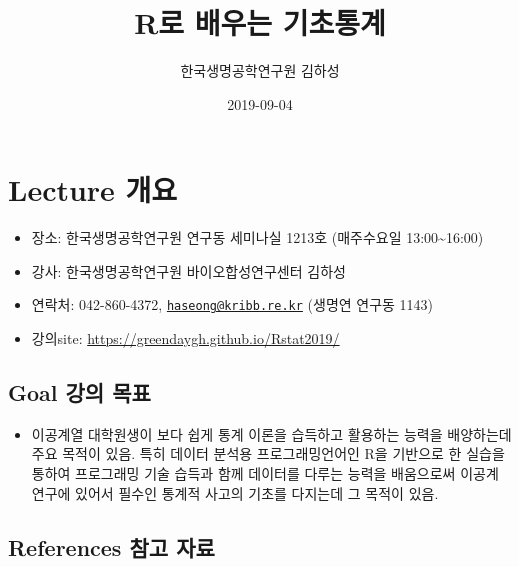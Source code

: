 \documentclass[]{book}
\title{R로 배우는 기초통계}
\author{한국생명공학연구원 김하성}
\date{2019-09-04}
\providecommand{\tightlist}{%
  \setlength{\itemsep}{0pt}\setlength{\parskip}{0pt}}
\begin{document}
\maketitle

{
\setcounter{tocdepth}{1}
\tableofcontents
}
\hypertarget{lecture-}{%
\chapter{Lecture 개요}\label{lecture-}}

\begin{itemize}
\tightlist
\item
  장소: 한국생명공학연구원 연구동 세미나실 1213호 (매주수요일 13:00\textasciitilde{}16:00)
\item
  강사: 한국생명공학연구원 바이오합성연구센터 김하성
\item
  연락처: 042-860-4372, \href{mailto:haseong@kribb.re.kr}{\nolinkurl{haseong@kribb.re.kr}} (생명연 연구동 1143)
\item
  강의site: \url{https://greendaygh.github.io/Rstat2019/}
\end{itemize}

\hypertarget{goal--}{%
\section{Goal 강의 목표}\label{goal--}}

\begin{itemize}
\tightlist
\item
  이공계열 대학원생이 보다 쉽게 통계 이론을 습득하고 활용하는 능력을 배양하는데 주요 목적이 있음. 특히 데이터 분석용 프로그래밍언어인 R을 기반으로 한 실습을 통하여 프로그래밍 기술 습득과 함께 데이터를 다루는 능력을 배움으로써 이공계 연구에 있어서 필수인 통계적 사고의 기초를 다지는데 그 목적이 있음.
\end{itemize}

\hypertarget{references--}{%
\section{References 참고 자료}\label{references--}}
\end{document}
